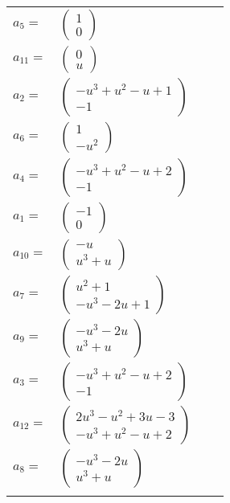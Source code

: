 \documentclass[1p]{elsarticle_modified}
\theoremstyle{definition}
\begin{document}
\begin{tabular}{m{7pt} m{180pt} m{7pt} m{180pt} }
\flushright $a_{5}=$&$\begin{pmatrix}1\\0\end{pmatrix}$ \\
\flushright $a_{11}=$&$\begin{pmatrix}0\\u\end{pmatrix}$ \\
\flushright $a_{2}=$&$\begin{pmatrix}- u^3+u^2- u+1\\-1\end{pmatrix}$ \\
\flushright $a_{6}=$&$\begin{pmatrix}1\\- u^2\end{pmatrix}$ \\
\flushright $a_{4}=$&$\begin{pmatrix}- u^3+u^2- u+2\\-1\end{pmatrix}$ \\
\flushright $a_{1}=$&$\begin{pmatrix}-1\\0\end{pmatrix}$ \\
\flushright $a_{10}=$&$\begin{pmatrix}- u\\u^3+u\end{pmatrix}$ \\
\flushright $a_{7}=$&$\begin{pmatrix}u^2+1\\- u^3-2 u+1\end{pmatrix}$ \\
\flushright $a_{9}=$&$\begin{pmatrix}- u^3-2 u\\u^3+u\end{pmatrix}$ \\
\flushright $a_{3}=$&$\begin{pmatrix}- u^3+u^2- u+2\\-1\end{pmatrix}$ \\
\flushright $a_{12}=$&$\begin{pmatrix}2 u^3- u^2+3 u-3\\- u^3+u^2- u+2\end{pmatrix}$ \\
\flushright $a_{8}=$&$\begin{pmatrix}- u^3-2 u\\u^3+u\end{pmatrix}$\\&\end{tabular}
\end{document}
